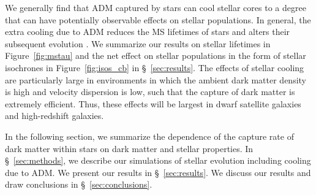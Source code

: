 \documentclass[useAMS,usenatbib]{mnras}
\begin{document}
  We generally find that ADM captured by stars can cool stellar cores to a degree that can have potentially
  observable effects on stellar populations. In general, the extra cooling due to ADM reduces the MS lifetimes 
  of stars and alters their subsequent evolution . We summarize our results on stellar lifetimes in Figure~\ref{fig:mstau}
  and the net effect on stellar populations in the form of stellar isochrones in Figure~\ref{fig:isos_cb} in
  \S~\ref{sec:results}. The effects of stellar cooling are particularly large in environments in which
  the ambient dark matter density is high and velocity dispersion is low, such that the capture of
  dark matter is extremely efficient. Thus, these effects will be largest in dwarf satellite galaxies
  and high-redshift galaxies.

  In the following section, we summarize the dependence of the capture rate of dark matter
  within stars on dark matter and stellar properties. In \S~\ref{sec:methods}, we describe
  our simulations of stellar evolution including cooling due to ADM. We present our results
  in \S~\ref{sec:results}. We discuss our results and draw conclusions in \S~\ref{sec:conclusions}.


\end{document}
